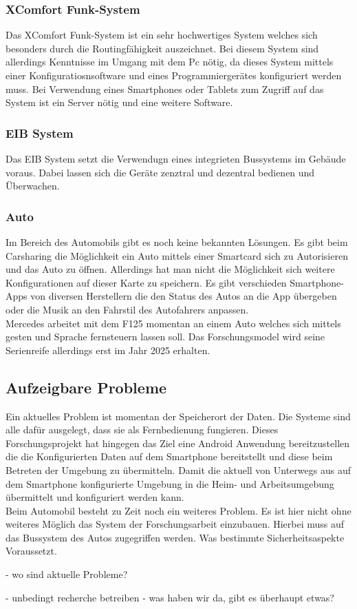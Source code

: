 \subsubsection{XComfort Funk-System}
Das XComfort Funk-System ist ein sehr hochwertiges System welches sich besonders durch die Routingfähigkeit auszeichnet. 
Bei diesem System sind allerdings Kenntnisse im Umgang mit dem Pc nötig, da dieses System mittels einer Konfiguratiosnsoftware und eines 
Programmiergerätes konfiguriert werden muss. Bei Verwendung eines Smartphones oder Tablets zum Zugriff auf das System ist ein Server nötig und eine weitere Software.

\subsubsection{EIB System}
Das EIB System setzt die Verwendugn eines integrieten Bussystems im Gebäude voraus. Dabei lassen sich die Geräte zenztral und dezentral bedienen und Überwachen. 

\subsubsection{Auto}
Im Bereich des Automobils gibt es noch keine bekannten Lösungen. Es gibt beim Carsharing die Möglichkeit ein Auto mittels einer Smartcard sich zu 
Autorisieren und das Auto zu öffnen. Allerdings hat man nicht die Möglichkeit sich weitere Konfigurationen auf dieser Karte zu speichern. 
Es gibt verschieden Smartphone-Apps von diversen Herstellern die den Status des Autos an die App übergeben oder die Musik an den Fahrstil des Autofahrers
anpassen. 
\\ 
Mercedes arbeitet mit dem F125 momentan an einem Auto welches sich mittels gesten und Sprache fernsteuern lassen soll. 
Das Forschungsmodel wird seine Serienreife allerdings erst im Jahr 2025 erhalten.

\subsection{Aufzeigbare Probleme}
Ein aktuelles Problem ist momentan der Speicherort der Daten. Die Systeme sind alle dafür ausgelegt, dass sie als Fernbedienung fungieren.
Dieses Forschungsprojekt hat hingegen das Ziel eine Android Anwendung bereitzustellen die die Konfigurierten Daten auf dem Smartphone bereitstellt und 
diese beim Betreten der Umgebung zu übermitteln. Damit die aktuell von Unterwegs aus auf dem Smartphone konfigurierte Umgebung in die 
Heim- und Arbeitsumgebung übermittelt und konfiguriert werden kann. 
\\
Beim Automobil besteht zu Zeit noch ein weiteres Problem. Es ist hier nicht ohne weiteres Möglich das System der Forschungsarbeit einzubauen. Hierbei muss auf das Bussystem des
Autos zugegriffen werden. Was bestimmte Sicherheitsaspekte Voraussetzt. 


- wo sind aktuelle Probleme?

- unbedingt recherche betreiben 
- was haben wir da, gibt es überhaupt etwas? 
